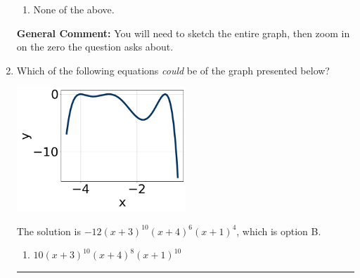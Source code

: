 \documentclass{extbook}[14pt]
\newcommand{\litem}[1]{\item #1

\rule{\textwidth}{0.4pt}}
\begin{document}
\begin{enumerate}
{\begin{enumerate}[label=\Alph*.]
\item None of the above.\end{enumerate}
\textbf{General Comment:} You will need to sketch the entire graph, then zoom in on the zero the question asks about.
}
\litem{
Which of the following equations \textit{could} be of the graph presented below?

\begin{center}
    \includegraphics[width=0.5\textwidth]{../Figures/polyGraphToFunctionA.png}
\end{center}




The solution is \( -12(x + 3)^{10} (x + 4)^{6} (x + 1)^{4} \), which is option B.\begin{enumerate}[label=\Alph*.]
\item \( 10(x + 3)^{10} (x + 4)^{8} (x + 1)^{10} \)


\end{enumerate}}
\end{enumerate}
\end{document}
